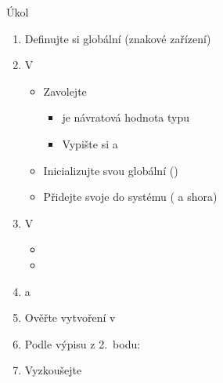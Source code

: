 \begin{frame}{Úkol}

  \begin{enumerate}
  \item Definujte si globální  (znakové zařízení)

  \item V 
  \begin{itemize}
    \item Zavolejte 
    \begin{itemize}
      \item {} je návratová hodnota typu 
      \item Vypište si  a 
    \end{itemize}
    \item Inicializujte svou globální  ()
    \item Přidejte svoje  do systému ( a
       shora)
  \end{itemize}

  \item V 
  \begin{itemize}
    \item {}
    \item {}
  \end{itemize}

  \item {} a 
  \item Ověřte vytvoření v 
  \item Podle výpisu z 2.\ bodu: 
  \item Vyzkoušejte 

  \end{enumerate}
\end{frame}


